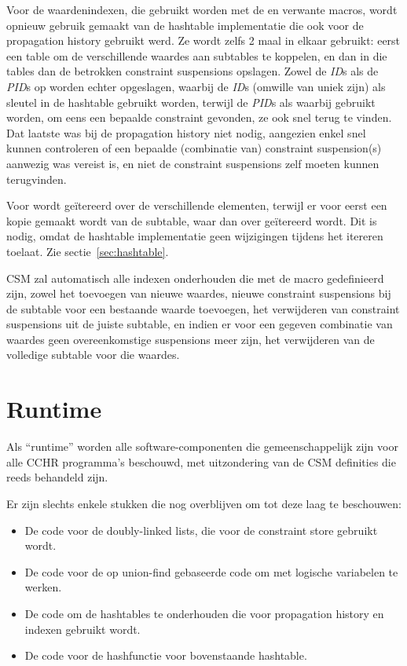 Voor de waardenindexen, die gebruikt worden met de  en verwante macros, wordt opnieuw gebruik gemaakt van de hashtable implementatie die ook voor de propagation history gebruikt werd. Ze wordt zelfs 2 maal in elkaar gebruikt: eerst een table om de verschillende waardes aan subtables te koppelen, en dan in die tables dan de betrokken constraint suspensions opslagen. Zowel de {\em ID}s als de {\em PID}s op worden echter opgeslagen, waarbij de {\em ID}s (omwille van uniek zijn) als sleutel in de hashtable gebruikt worden, terwijl de {\em PID}s als waarbij gebruikt worden, om eens een bepaalde constraint gevonden, ze ook snel terug te vinden. Dat laatste was bij de propagation history niet nodig, aangezien enkel snel kunnen controleren of een bepaalde (combinatie van) constraint suspension(s) aanwezig was vereist is, en niet de constraint suspensions zelf moeten kunnen terugvinden.

Voor  wordt ge\"itereerd over de verschillende elementen, terwijl er voor  eerst een kopie gemaakt wordt van de subtable, waar dan over ge\"itereerd wordt. Dit is nodig, omdat de hashtable implementatie geen wijzigingen tijdens het itereren toelaat. Zie sectie~\ref{sec:hashtable}.

CSM zal automatisch alle indexen onderhouden die met de macro  gedefinieerd zijn, zowel het toevoegen van nieuwe waardes, nieuwe constraint suspensions bij de subtable voor een bestaande waarde toevoegen, het verwijderen van constraint suspensions uit de juiste subtable, en indien er voor een gegeven combinatie van waardes geen overeenkomstige suspensions meer zijn, het verwijderen van de volledige subtable voor die waardes.

\section{Runtime} \label{sec:runtime}

Als ``runtime'' worden alle software-componenten die gemeenschappelijk zijn voor alle CCHR programma's beschouwd, met uitzondering van de CSM definities die reeds behandeld zijn.

Er zijn slechts enkele stukken die nog overblijven om tot deze laag te beschouwen: \begin{itemize}
  \item De code voor de doubly-linked lists, die voor de constraint store gebruikt wordt.
  \item De code voor de op union-find gebaseerde code om met logische variabelen te werken.
  \item De code om de hashtables te onderhouden die voor propagation history en indexen gebruikt wordt.
  \item De code voor de hashfunctie voor bovenstaande hashtable.
\end{itemize}

